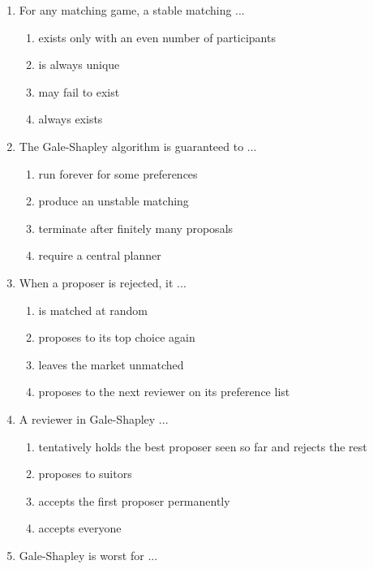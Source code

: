 \documentclass[11pt]{article}
\begin{document}
\begin{enumerate}[itemsep=6pt]
\begin{enumerate}
    \item a bijection pairing each member of one set with one member of the other
    \item a payoff matrix
    \item a set of blocking pairs
    \item a ranking of all participants
  \end{enumerate}
  \item For any matching game, a stable matching ...
  \begin{enumerate}
    \item exists only with an even number of participants
    \item is always unique
    \item may fail to exist
    \item always exists
  \end{enumerate}
  \item The Gale-Shapley algorithm is guaranteed to ...
  \begin{enumerate}
    \item run forever for some preferences
    \item produce an unstable matching
    \item terminate after finitely many proposals
    \item require a central planner
  \end{enumerate}
  \item When a proposer is rejected, it ...
  \begin{enumerate}
    \item is matched at random
    \item proposes to its top choice again
    \item leaves the market unmatched
    \item proposes to the next reviewer on its preference list
  \end{enumerate}
  \item A reviewer in Gale-Shapley ...
  \begin{enumerate}
    \item tentatively holds the best proposer seen so far and rejects the rest
    \item proposes to suitors
    \item accepts the first proposer permanently
    \item accepts everyone
  \end{enumerate}
  \item Gale-Shapley is worst for ...

\end{enumerate}
\end{document}
